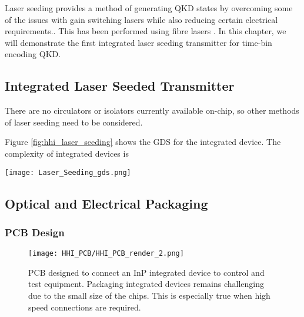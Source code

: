 Laser seeding provides a method of generating \ac{QKD} states by overcoming some of the issues with gain switching lasers while also reducing certain electrical requirements.. This has been performed using fibre lasers \cite{}. In this chapter, we will demonstrate the first integrated laser seeding transmitter for time-bin encoding \ac{QKD}. 

\subsection{Integrated Laser Seeded Transmitter}

There are no circulators or isolators currently available on-chip, so other methods of laser seeding need to be considered.

Figure \ref{fig:hhi_laser_seeding} shows the GDS for the integrated device. The complexity of integrated devices is 

\begin{sidewaysfigure}
	\centering
	\texttt{[image: Laser\_Seeding\_gds.png]}
	\caption[InP laser seeding transmitter with QRNG]{This shows the layout of the laser seeded transmitter device fabricated by HHI. The chip measures \SI[product-units=power]{6x4}{mm} and contains two laser seeding prototype circuits, a homodyne \ac{qrng} and test structure to measure laser and waveguide performances. This demonstrates the complexity and compactness possible in the integrated platform.}
	\label{fig:hhi_laser_seeding}
\end{sidewaysfigure}

\subsection{Optical and Electrical Packaging}

\subsubsection*{PCB Design}

\begin{figure}[tbp]
	\centering
	\texttt{[image: HHI\_PCB/HHI\_PCB\_render\_2.png]}
	\caption[PCB breakout for an InP integrated circuit]{PCB designed to connect an \ac{InP} integrated device to control and test equipment. Packaging integrated devices remains challenging due to the small size of the chips. This is especially true when high speed connections are required.}
	\label{fig:hhi_pcb}
\end{figure}

